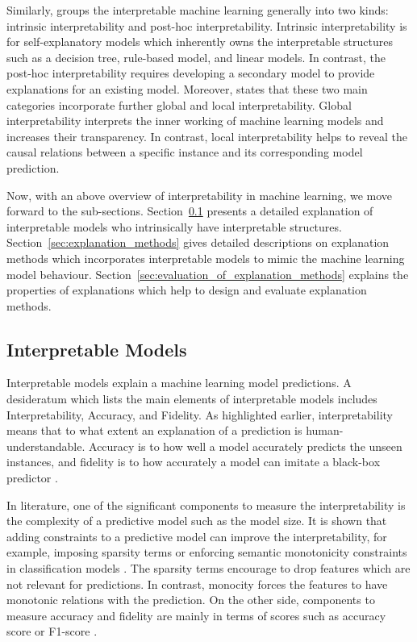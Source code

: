 \documentclass[english]{tktltiki2}
\theoremstyle{definition}
\theoremstyle{remark}
\begin{document}
Similarly, \citet{murdoch2019interpretable} groups the interpretable machine learning generally into two kinds: intrinsic interpretability and post-hoc interpretability. Intrinsic interpretability is for self-explanatory models which inherently owns the interpretable structures such as a decision tree, rule-based model, and linear models. In contrast, the post-hoc interpretability requires developing a secondary model to provide explanations for an existing model. Moreover, \citet{murdoch2019interpretable} states that these two main categories incorporate further global and local interpretability. Global interpretability interprets the inner working of machine learning models and increases their transparency. In contrast,  local interpretability helps to reveal the causal relations between a specific instance and its corresponding model prediction.

Now, with an above overview of interpretability in machine learning, we move forward to the sub-sections. Section~\ref{sec:interpretable_models} presents a detailed explanation of interpretable models who intrinsically have interpretable structures. Section~\ref{sec:explanation_methods} gives detailed descriptions on explanation methods which incorporates interpretable models to mimic the machine learning model behaviour. Section~\ref{sec:evaluation_of_explanation_methods} explains the properties of explanations which help to design and evaluate explanation methods.


\subsection{Interpretable Models}\label{sec:interpretable_models} %

Interpretable models explain a machine learning model predictions. A desideratum which lists the main elements of interpretable models includes Interpretability, Accuracy, and Fidelity. As highlighted earlier, interpretability means that to what extent an explanation of a prediction is human-understandable. Accuracy is to how well a model accurately predicts the unseen instances, and fidelity is to how accurately a model can imitate a black-box predictor \citep{molnarinterpretable, guidotti2018survey}. 

In literature, one of the significant components to measure the interpretability is the complexity of a predictive model such as the model size. It is shown that adding constraints to a predictive model can improve the interpretability, for example, imposing sparsity terms or enforcing semantic monotonicity constraints in classification models \citep{murdoch2019interpretable}. The sparsity terms encourage to drop features which are not relevant for predictions. In contrast, monocity forces the features to have monotonic relations with the prediction. On the other side, components to measure accuracy and fidelity are mainly in terms of scores such as accuracy score or F1-score \citep{molnarinterpretable, guidotti2018survey, murdoch2019interpretable}.
\end{document}
